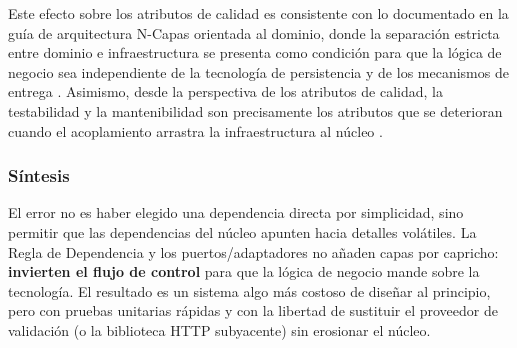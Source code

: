 Este efecto sobre los atributos de calidad es consistente con lo documentado en la guía de arquitectura N-Capas orientada al dominio, donde la separación estricta entre dominio e infraestructura se presenta como condición para que la lógica de negocio sea independiente de la tecnología de persistencia y de los mecanismos de entrega \parencite{torre2010guia}. Asimismo, desde la perspectiva de los atributos de calidad, la testabilidad y la mantenibilidad son precisamente los atributos que se deterioran cuando el acoplamiento arrastra la infraestructura al núcleo \parencite{richards2020fundamentals}.

\subsubsection{Síntesis}
El error no es haber elegido una dependencia directa por simplicidad, sino permitir que las dependencias del núcleo apunten hacia detalles volátiles. La Regla de Dependencia y los puertos/adaptadores no añaden capas por capricho: \textbf{invierten el flujo de control} para que la lógica de negocio mande sobre la tecnología. El resultado es un sistema algo más costoso de diseñar al principio, pero con pruebas unitarias rápidas y con la libertad de sustituir el proveedor de validación (o la biblioteca HTTP subyacente) sin erosionar el núcleo.